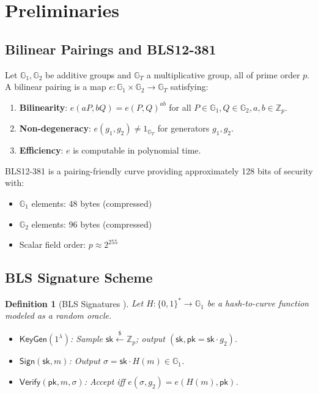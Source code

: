 \documentclass[11pt,a4paper]{article}
\newtheorem{definition}{Definition}
\begin{document}
\section{Preliminaries}\label{sec:prelim}

\subsection{Bilinear Pairings and BLS12-381}

Let $\mathbb{G}_1, \mathbb{G}_2$ be additive groups and $\mathbb{G}_T$ a multiplicative group, all of prime order $p$. A bilinear pairing is a map $e : \mathbb{G}_1 \times \mathbb{G}_2 \to \mathbb{G}_T$ satisfying:
\begin{enumerate}
    \item \textbf{Bilinearity}: $e(aP, bQ) = e(P, Q)^{ab}$ for all $P \in \mathbb{G}_1, Q \in \mathbb{G}_2, a, b \in \mathbb{Z}_p$.
    \item \textbf{Non-degeneracy}: $e(g_1, g_2) \neq 1_{\mathbb{G}_T}$ for generators $g_1, g_2$.
    \item \textbf{Efficiency}: $e$ is computable in polynomial time.
\end{enumerate}

BLS12-381 \cite{bowe2017bls12381} is a pairing-friendly curve providing approximately 128 bits of security with:
\begin{itemize}
    \item $\mathbb{G}_1$ elements: 48 bytes (compressed)
    \item $\mathbb{G}_2$ elements: 96 bytes (compressed)
    \item Scalar field order: $p \approx 2^{255}$
\end{itemize}

\subsection{BLS Signature Scheme}

\begin{definition}[BLS Signatures \cite{boneh2001bls}]
Let $H : \{0,1\}^* \to \mathbb{G}_1$ be a hash-to-curve function modeled as a random oracle.
\begin{itemize}
    \item $\mathsf{KeyGen}(1^\lambda)$: Sample $\mathsf{sk} \xleftarrow{\$} \mathbb{Z}_p$; output $(\mathsf{sk}, \mathsf{pk} = \mathsf{sk} \cdot g_2)$.
    \item $\mathsf{Sign}(\mathsf{sk}, m)$: Output $\sigma = \mathsf{sk} \cdot H(m) \in \mathbb{G}_1$.
    \item $\mathsf{Verify}(\mathsf{pk}, m, \sigma)$: Accept iff $e(\sigma, g_2) = e(H(m), \mathsf{pk})$.
\end{itemize}
\end{definition}
\end{document}
